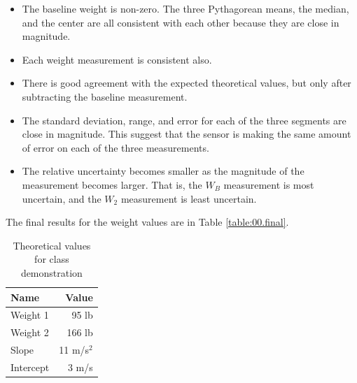 \begin{itemize}
    \item The baseline weight is non-zero. The three Pythagorean means, the median, and the center are all consistent with each other because they are close in magnitude.
    \item Each weight measurement is consistent also.
    \item There is good agreement with the expected theoretical values, but only after subtracting the baseline measurement.
    \item The standard deviation, range, and error for each of the three segments are close in magnitude. This suggest that the sensor is making the same amount of error on each of the three measurements.
    \item The relative uncertainty becomes smaller as the magnitude of the measurement becomes larger. That is, the $W_{B}$ measurement is most uncertain, and the $W_{2}$ measurement is least uncertain.
\end{itemize}
The final results for the weight values are in Table \ref{table:00.final}.
\begin{table}
    \centering
    \begin{tabular}{|l|r|}
        \hline
        \textbf{Name} & \textbf{Value} \\
        \hline
        Weight 1 & 95 lb \\
        Weight 2 & 166 lb \\
        \hline
        Slope & 11 m/s$^{2}$ \\
        Intercept & 3 m/s \\
        \hline
    \end{tabular}
    \caption{Theoretical values for class demonstration}
    \label{table:00.theoretical.demo}
\end{table}
